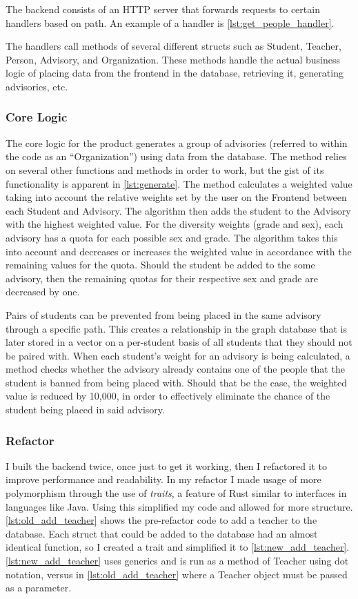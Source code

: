 \documentclass{paper}
\begin{document}
The backend consists of an HTTP server that forwards requests to certain handlers based on path.
An example of a handler is \cref{lst:get_people_handler}.



The handlers call methods of several different structs such as Student, Teacher, Person, Advisory, and Organization.
These methods handle the actual business logic of placing data from the frontend in the database, retrieving it, generating advisories, etc.

\subsubsection{Core Logic}
The core logic for the product generates a group of advisories (referred to within the code as an \enquote{Organization}) using data from the database.
The method relies on several other functions and methods in order to work, but the gist of its functionality is apparent in \cref{lst:generate}.
The method calculates a weighted value taking into account the relative weights set by the user on the Frontend between each Student and Advisory.
The algorithm then adds the student to the Advisory with the highest weighted value.
For the diversity weights (grade and sex), each advisory has a quota for each possible sex and grade.
The algorithm takes this into account and decreases or increases the weighted value in accordance with the remaining values for the quota.
Should the student be added to the some advisory, then the remaining quotas for their respective sex and grade are decreased by one.

Pairs of students can be prevented from being placed in the same advisory through a specific path.
This creates a relationship in the graph database that is later stored in a vector on a per-student basis of all students that they should not be paired with.
When each student's weight for an advisory is being calculated, a method checks whether the advisory already contains one of the people that the student is banned from being placed with.
Should that be the case, the weighted value is reduced by 10,000, in order to effectively eliminate the chance of the student being placed in said advisory.



\subsubsection{Refactor}
I built the backend twice, once just to get it working, then I refactored it to improve performance and readability.
In my refactor I made usage of more polymorphism through the use of \emph{traits}, a feature of Rust similar to interfaces in languages like Java.
Using this simplified my code and allowed for more structure.
\cref{lst:old_add_teacher} shows the pre-refactor code to add a teacher to the database.
Each struct that could be added to the database had an almost identical function, so I created a trait and simplified it to \cref{lst:new_add_teacher}.
\cref{lst:new_add_teacher} uses generics and is run as a method of Teacher using dot notation, versus in \cref{lst:old_add_teacher} where a Teacher object must be passed as a parameter.
\end{document}
